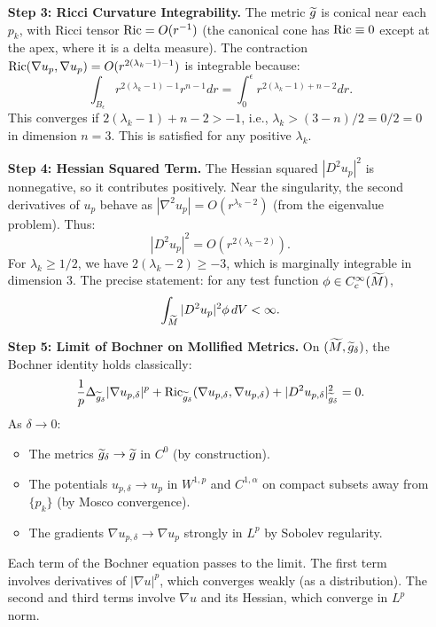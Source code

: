 \begin{theorem}
\begin{enumerate}
    \item[\textbf{Step 3: Ricci Curvature Integrability.}] The metric $\widetilde{g}$ is conical near each $p_k$, with Ricci tensor $\mathrm{Ric} = O(r^{-1})$ (the canonical cone has $\mathrm{Ric} \equiv 0$ except at the apex, where it is a delta measure). The contraction $\mathrm{Ric}(\nabla u_p, \nabla u_p) = O(r^{2(\lambda_k-1)-1})$ is integrable because:
    \begin{equation}
        \int_{B_\epsilon} r^{2(\lambda_k-1)-1} r^{n-1} dr = \int_0^\epsilon r^{2(\lambda_k-1)+n-2} dr.
    \end{equation}
    This converges if $2(\lambda_k - 1) + n - 2 > -1$, i.e., $\lambda_k > (3-n)/2 = 0/2 = 0$ in dimension $n=3$. This is satisfied for any positive $\lambda_k$.
    
    \item[\textbf{Step 4: Hessian Squared Term.}] The Hessian squared $|D^2 u_p|^2$ is nonnegative, so it contributes positively. Near the singularity, the second derivatives of $u_p$ behave as $|\nabla^2 u_p| = O(r^{\lambda_k - 2})$ (from the eigenvalue problem). Thus:
    \begin{equation}
        |D^2 u_p|^2 = O(r^{2(\lambda_k-2)}).
    \end{equation}
    For $\lambda_k \ge 1/2$, we have $2(\lambda_k - 2) \ge -3$, which is marginally integrable in dimension 3. The precise statement: for any test function $\phi \in C_c^\infty(\widetilde{M})$,
    \begin{equation}
        \int_{\widetilde{M}} |D^2 u_p|^2 \phi \, dV < \infty.
    \end{equation}
    
    \item[\textbf{Step 5: Limit of Bochner on Mollified Metrics.}] On $(\widetilde{M}, \widetilde{g}_\delta)$, the Bochner identity holds classically:
    \begin{equation}
        \frac{1}{p} \Delta_{\widetilde{g}_\delta} |\nabla u_{p,\delta}|^p + \mathrm{Ric}_{\widetilde{g}_\delta}(\nabla u_{p,\delta}, \nabla u_{p,\delta}) + |D^2 u_{p,\delta}|^2_{\widetilde{g}_\delta} = 0.
    \end{equation}
    As $\delta \to 0$:
    \begin{itemize}
        \item The metrics $\widetilde{g}_\delta \to \widetilde{g}$ in $C^0$ (by construction).
        \item The potentials $u_{p,\delta} \to u_p$ in $W^{1,p}$ and $C^{1,\alpha}$ on compact subsets away from $\{p_k\}$ (by Mosco convergence).
        \item The gradients $\nabla u_{p,\delta} \to \nabla u_p$ strongly in $L^p$ by Sobolev regularity.
    \end{itemize}
    Each term of the Bochner equation passes to the limit. The first term involves derivatives of $|\nabla u|^p$, which converges weakly (as a distribution). The second and third terms involve $\nabla u$ and its Hessian, which converge in $L^p$ norm.
    

\end{enumerate}
\end{theorem}
